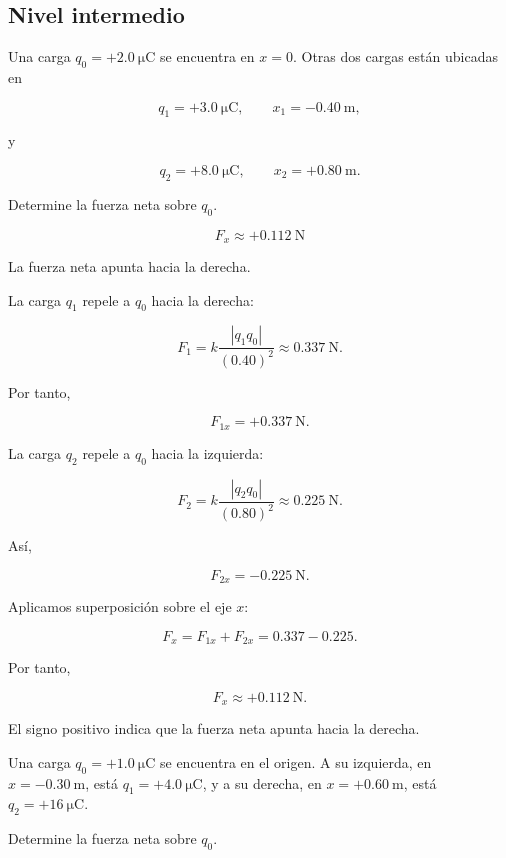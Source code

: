 \subsection{Nivel intermedio}

\begin{ejercicio}
Una carga \(q_0=+\SI{2.0}{\micro\coulomb}\) se encuentra en \(x=0\).
Otras dos cargas están ubicadas en

\[
q_1=+\SI{3.0}{\micro\coulomb}, \qquad x_1=-\SI{0.40}{\metre},
\]

y

\[
q_2=+\SI{8.0}{\micro\coulomb}, \qquad x_2=+\SI{0.80}{\metre}.
\]

Determine la fuerza neta sobre \(q_0\).
\end{ejercicio}

\begin{respuesta}
\[
\boxed{F_x\approx+\SI{0.112}{\newton}}
\]

La fuerza neta apunta hacia la derecha.
\end{respuesta}

\begin{explicacion}
La carga \(q_1\) repele a \(q_0\) hacia la derecha:

\[
F_1=k\frac{|q_1q_0|}{(0.40)^2}
\approx\SI{0.337}{\newton}.
\]

Por tanto,

\[
F_{1x}=+\SI{0.337}{\newton}.
\]

La carga \(q_2\) repele a \(q_0\) hacia la izquierda:

\[
F_2=k\frac{|q_2q_0|}{(0.80)^2}
\approx\SI{0.225}{\newton}.
\]

Así,

\[
F_{2x}=-\SI{0.225}{\newton}.
\]

Aplicamos superposición sobre el eje \(x\):

\[
F_x=F_{1x}+F_{2x}=0.337-0.225.
\]

Por tanto,

\[
\boxed{F_x\approx+\SI{0.112}{\newton}}.
\]

El signo positivo indica que la fuerza neta apunta hacia la derecha.
\end{explicacion}


\begin{ejercicio}
Una carga \(q_0=+\SI{1.0}{\micro\coulomb}\) se encuentra en el origen.
A su izquierda, en \(x=-\SI{0.30}{\metre}\), está
\(q_1=+\SI{4.0}{\micro\coulomb}\), y a su derecha, en
\(x=+\SI{0.60}{\metre}\), está \(q_2=+\SI{16}{\micro\coulomb}\).

Determine la fuerza neta sobre \(q_0\).
\end{ejercicio}

